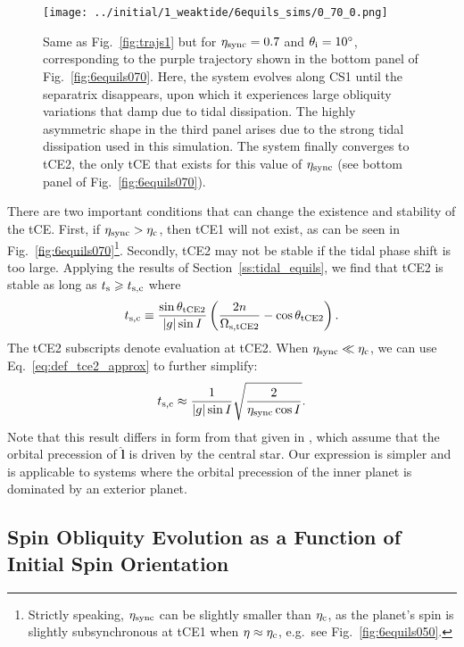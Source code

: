 \documentclass[
        fleqn,
        usenatbib,
        referee,
    ]{mnras}
\newcommand*{\abs}[1]{\left|#1\right|}
\newcommand*{\p}[1]{\left(#1\right)}
\newcommand*{\uv}[1]{\hat{\boldsymbol{\mathbf{#1}}}}
\newlength{\colummwidth}
\begin{document}
\begin{figure}
    \texttt{[image: ../initial/1\_weaktide/6equils\_sims/0\_70\_0.png]}
    \caption{Same as Fig.~\ref{fig:trajs1} but for $\eta_{\rm sync} = 0.7$ and
    $\theta_{\rm i} = 10^\circ$, corresponding to the purple trajectory shown in
    the bottom panel of Fig.~\ref{fig:6equils070}. Here, the system evolves
    along CS1 until the separatrix disappears, upon which it experiences large
    obliquity variations that damp due to tidal dissipation. The highly
    asymmetric shape in the third panel arises due to the strong tidal
    dissipation used in this simulation. The system finally converges to tCE2,
    the only tCE that exists for this value of $\eta_{\rm sync}$ (see bottom
    panel of Fig.~\ref{fig:6equils070}).}\label{fig:trajs3}
\end{figure}

There are two important conditions that can change the existence and stability
of the tCE\@. First, if $\eta_{\rm sync} > \eta_{\rm c}$, then tCE1 will not
exist, as can be seen in Fig.~\ref{fig:6equils070}\footnote{Strictly speaking,
$\eta_{\rm sync}$ can be slightly smaller than $\eta_{\rm c}$, as the planet's
spin is slightly subsynchronous at tCE1 when $\eta \approx \eta_{\rm c}$, e.g.\
see Fig.~\ref{fig:6equils050}.}. Secondly, tCE2 may not be stable if the tidal
phase shift is too large. Applying the results of Section~\ref{ss:tidal_equils},
we find that tCE2 is stable as long as $t_{\rm s} \geq t_{\rm s, c}$ where
\begin{equation}
    t_{\rm s, c} \equiv \frac{\sin \theta_{\rm tCE2}}{\abs{g} \sin
            I}\p{\frac{2n}{\Omega_{\rm s, tCE2}} - \cos \theta_{\rm tCE2}}.
\end{equation}
The tCE2 subscripts denote evaluation at tCE2. When $\eta_{\rm sync} \ll
\eta_{\rm c}$, we can use Eq.~\eqref{eq:def_tce2_approx} to further simplify:
\begin{equation}
    t_{\rm s, c}\approx \frac{1}{\abs{g}\sin I}\sqrt{\frac{2}{\eta_{\rm sync}
        \cos I}}. \label{eq:def_ts_crit}
\end{equation}
Note that this result differs in form from that given in
\citet{fabrycky_otides}, which assume that the orbital precession of $\uv{l}$ is
driven by the central star. Our expression is simpler and is applicable to
systems where the orbital precession of the inner planet is dominated by an
exterior planet.

\subsection{Spin Obliquity Evolution as a Function of Initial Spin Orientation}
\end{document}
